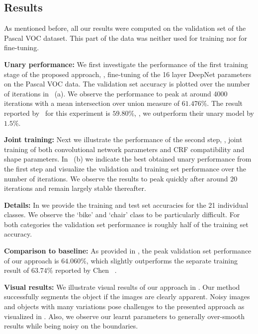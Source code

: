 \subsection{Results}
As mentioned before, all our results were computed on the validation set of the Pascal VOC dataset. This part of the data was neither used for training nor for fine-tuning. 

{\bfseries Unary performance:} We first investigate the performance of the first training stage of the proposed approach, \ie, fine-tuning of the 16 layer DeepNet parameters on the Pascal VOC data. The validation set accuracy is plotted over the number of iterations in ~(a). We observe the performance to peak at around 4000 iterations with a mean intersection over union measure of $61.476\%$. The result reported by~\cite{ChenARXIV2015b} for this experiment is $59.80\%$, \ie, we outperform their unary model by $1.5\%$. 



{\bfseries Joint training:} Next we illustrate the performance of the second step, \ie, joint training of both convolutional network parameters and CRF compatibility and shape parameters. In ~(b) we indicate the best obtained unary performance from the first step and visualize the validation and training set performance over the number of iterations. We observe the results to peak quickly after around $20$ iterations and remain largely stable thereafter. 





{\bfseries Details: } In  we provide the training and test set accuracies for the 21 individual classes. We observe the `bike' and `chair' class to be particularly difficult. For both categories the validation set performance is roughly half of the training set accuracy.

{\bfseries Comparison to baseline: } As provided in , the peak validation set performance of our approach is $64.060\%$, which slightly outperforms the separate training result of $63.74\%$ reported by Chen \etal~\cite{ChenARXIV2015b}.





{\bfseries Visual results: } We illustrate visual results of our approach in . Our method successfully segments the object if the images are clearly apparent. Noisy images and objects with many variations pose challenges to the presented approach as visualized in . Also, we observe our learnt parameters to generally over-smooth results while being noisy on the boundaries. 















